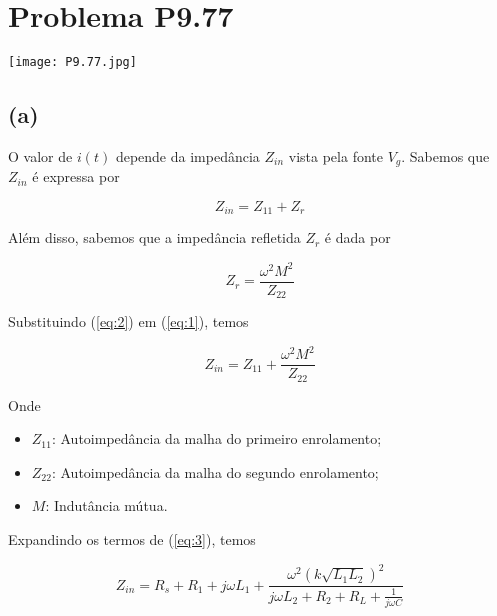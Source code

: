 \documentclass[12pt]{scrartcl}
\begin{document}

    \section*{Problema P9.77}

    \begin{center}
        \texttt{[image: P9.77.jpg]}
    \end{center}

    \subsection*{(a)}

    O valor de \(i(t)\) depende da impedância \(Z_{in}\) vista pela fonte \(V_{g}\).
    Sabemos que \(Z_{in}\) é expressa por

    \begin{equation}\label{eq:1}
        Z_{in} = Z_{11} + Z_{r}
    \end{equation}

    Além disso, sabemos que a impedância refletida \(Z_{r}\) é dada por

    \begin{equation}\label{eq:2}
        Z_{r} = \frac{\omega^2M^2}{Z_{22}}
    \end{equation}

    Substituindo (\ref{eq:2}) em (\ref{eq:1}), temos

    \begin{equation}\label{eq:3}
        Z_{in} = Z_{11} + \frac{\omega^2M^2}{Z_{22}}
    \end{equation}

    Onde
    \begin{itemize}
        \item \(Z_{11}\): Autoimpedância da malha do primeiro enrolamento;
        \item \(Z_{22}\): Autoimpedância da malha do segundo enrolamento;
        \item \(M\): Indutância mútua.
    \end{itemize}

    Expandindo os termos de (\ref{eq:3}), temos

    \begin{equation}\label{eq:4}
        Z_{in} = R_s + R_1 + j \omega L_1 + \frac{\omega^2(k\sqrt{L_1L_2})^2}{j\omega L_2 + R_2 + R_L + \frac{1}{j\omega C}}
    \end{equation}
\end{document}
